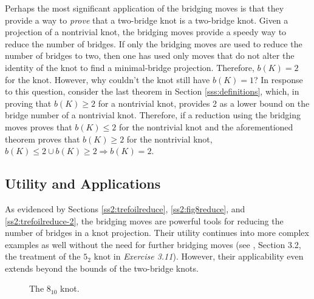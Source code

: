 \documentclass[titlepage]{article}
\begin{document}
Perhaps the most significant application of the bridging moves is that they provide a way to \emph{prove} that a two-bridge knot is a two-bridge knot. Given a projection of a nontrivial knot, the bridging moves provide a speedy way to reduce the number of bridges. If only the bridging moves are used to reduce the number of bridges to two, then one has used only moves that do not alter the identity of the knot to find a minimal-bridge projection. Therefore, $b(K)=2$ for the knot. However, why couldn't the knot still have $b(K)=1$? In response to this question, consider the last theorem in Section \ref{sss:definitions}, which, in proving that $b(K)\geq 2$ for a nontrivial knot, provides 2 as a lower bound on the bridge number of a nontrivial knot. Therefore, if a reduction using the bridging moves proves that $b(K)\leq 2$ for the nontrivial knot and the aforementioned theorem proves that $b(K)\geq 2$ for the nontrivial knot, $b(K)\leq 2 \cup b(K)\geq 2\Rightarrow b(K)=2$.


\subsection{Utility and Applications}\label{sss:utility}
As evidenced by Sections \ref{ss2:trefoilreduce}, \ref{ss2:fig8reduce}, and \ref{ss2:trefoilreduce-2}, the bridging moves are powerful tools for reducing the number of bridges in a knot projection. Their utility continues into more complex examples as well without the need for further bridging moves (see \cite{bib:knotnotes}, Section 3.2, the treatment of the $5_2$ knot in \emph{Exercise 3.11}). However, their applicability even extends beyond the bounds of the two-bridge knots.\par

\begin{figure}[h!]
    \centering
    \vspace{-1.5em}
    \caption{The $8_{10}$ knot.}
    \label{fig:810}
\end{figure}
\end{document}
